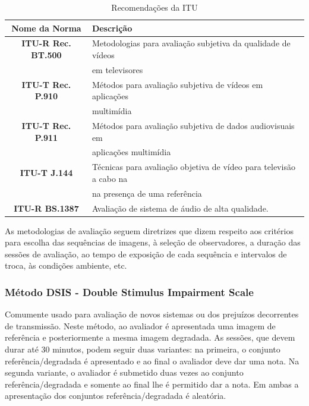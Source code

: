 \begin{table}
	\centering
	\caption{Recomendações da ITU}
	\label{tab:recomendacoes}
	\begin{tabular}{c|l}
		\hline
		\textbf{Nome da Norma} & Descrição \\
		\hline
		\textbf{ITU-R Rec. BT.500} & Metodologias para avaliação subjetiva da qualidade de vídeos \\
			& em televisores \\
		\textbf{ITU-T Rec. P.910} & Métodos para avaliação subjetiva de vídeos em aplicações \\
			& multimídia \\
		\textbf{ITU-T Rec. P.911} & Métodos para avaliação subjetiva de dados audiovisuais em \\
			& aplicações multimídia \\
		\textbf{ITU-T J.144} & Técnicas para avaliação objetiva de vídeo para televisão a cabo na \\
			& na presença de uma referência \\
		\textbf{ITU-R BS.1387} & Avaliação de sistema de áudio de alta qualidade. \\
		\hline
	\end{tabular}
\end{table}

As metodologias de avaliação seguem diretrizes que dizem respeito aos critérios para escolha das sequências de imagens, à seleção de observadores, a duração das sessões de avaliação, ao tempo de exposição de cada sequência e intervalos de troca, às condições ambiente, etc.

\subsubsection[Método DSIS]{Método DSIS - Double Stimulus Impairment Scale}

Comumente usado para avaliação de novos sistemas ou dos prejuízos decorrentes de transmissão. Neste método, ao avaliador é apresentada uma imagem de referência e posteriormente a mesma imagem degradada. As sessões, que devem durar até 30 minutos, podem seguir duas variantes: na primeira, o conjunto referência/degradada é apresentado e ao final o avaliador deve dar uma nota. Na segunda variante, o avaliador é submetido duas vezes ao conjunto referência/degradada e somente ao final lhe é permitido dar a nota. Em ambas a apresentação dos conjuntos referência/degradada é aleatória.

